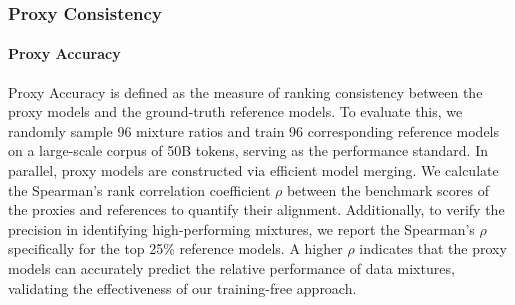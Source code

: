 \documentclass{article}
\theoremstyle{plain}
\theoremstyle{definition}
\theoremstyle{remark}
\begin{document}
\subsubsection{Proxy Consistency}
\paragraph{Proxy Accuracy} Proxy Accuracy is defined as the measure of ranking consistency between the proxy models and the ground-truth reference models. To evaluate this, we randomly sample 96 mixture ratios and train 96 corresponding reference models on a large-scale corpus of 50B tokens, serving as the performance standard. In parallel, proxy models are constructed via efficient model merging. We calculate the Spearman's rank correlation coefficient $\rho$ \cite{spearman1961proof} between the benchmark scores of the proxies and references to quantify their alignment. Additionally, to verify the precision in identifying high-performing mixtures, we report the Spearman's $\rho$ specifically for the top 25\% reference models. A higher $\rho$ indicates that the proxy models can accurately predict the relative performance of data mixtures, validating the effectiveness of our training-free approach.
\end{document}
